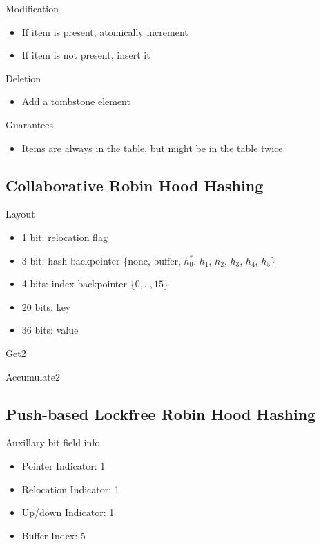 \documentclass{article}
\begin{document}
Modification
\begin{itemize}
\item If item is present, atomically increment
\item If item is not present, insert it
\end{itemize}

Deletion
\begin{itemize}
\item Add a tombstone element
\end{itemize}

Guarantees
\begin{itemize}
\item Items are always in the table, but might be in the table twice
\end{itemize}

\subsection{Collaborative Robin Hood Hashing}

Layout
\begin{itemize}
\item 1 bit: relocation flag
\item 3 bit: hash backpointer \{none, buffer, $h^*_0$, $h_1$, $h_2$, $h_3$, $h_4$, $h_5$\}
\item 4 bits: index backpointer \{$0,..,15$\}
\item 20 bits: key
\item 36 bits: value
\end{itemize}

Get2

Accumulate2

\subsection{Push-based Lockfree Robin Hood Hashing}

Auxillary bit field info
\begin{itemize}
\item Pointer Indicator: 1
\item Relocation Indicator: 1
\item Up/down Indicator: 1
\item Buffer Index: 5
\end{itemize}
\end{document}
